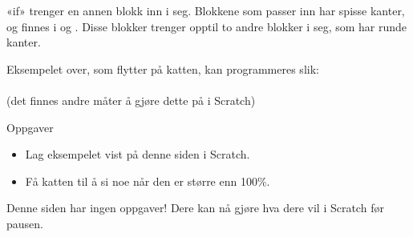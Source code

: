 \documentclass[a4paper,18pt]{article}
\newcommand{\block}[2][-0.4]{\raisebox{#1\height}{\texttt{[image: \#2]}}}
\begin{document}
\begin{large}
«if» trenger en annen blokk inn i seg. Blokkene som passer inn har spisse kanter, og finnes i \block{sensing} og
\block{operators}. Disse blokker trenger opptil to andre blokker i seg, som har runde kanter.

Eksempelet over, som flytter på katten, kan programmeres slik:
\\
\block{walk}
\\
(det finnes andre måter å gjøre dette på i Scratch)

Oppgaver
\begin{itemize}
    \item Lag eksempelet vist på denne siden i Scratch.
    \item Få katten til å si noe når den er større enn 100\%.
\end{itemize}

\newpage

Denne siden har ingen oppgaver! Dere kan nå gjøre hva dere vil i Scratch før pausen.
\end{large}
\end{document}
